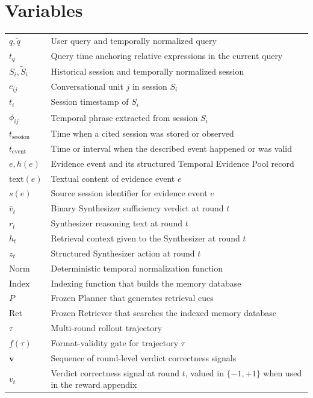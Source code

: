 \section*{Variables}
\renewcommand*{\arraystretch}{1.35}
\begin{longtable}{p{}p{}}
$q,\widetilde{q}$ & User query and temporally normalized query\\
$t_q$ & Query time anchoring relative expressions in the current query\\
$S_i,\widetilde{S}_i$ & Historical session and temporally normalized session\\
$c_{ij}$ & Conversational unit $j$ in session $S_i$\\
$t_i$ & Session timestamp of $S_i$\\
$\phi_{ij}$ & Temporal phrase extracted from session $S_i$\\
$t_{\mathrm{session}}$ & Time when a cited session was stored or observed\\
$t_{\mathrm{event}}$ & Time or interval when the described event happened or was valid\\
$e,h(e)$ & Evidence event and its structured Temporal Evidence Pool record\\
$\mathrm{text}(e)$ & Textual content of evidence event $e$\\
$s(e)$ & Source session identifier for evidence event $e$\\
$\hat{v}_t$ & Binary Synthesizer sufficiency verdict at round $t$\\
$r_t$ & Synthesizer reasoning text at round $t$\\
$h_t$ & Retrieval context given to the Synthesizer at round $t$\\
$z_t$ & Structured Synthesizer action at round $t$\\
$\mathrm{Norm}$ & Deterministic temporal normalization function\\
$\mathrm{Index}$ & Indexing function that builds the memory database\\
$P$ & Frozen Planner that generates retrieval cues\\
$\mathrm{Ret}$ & Frozen Retriever that searches the indexed memory database\\
$\tau$ & Multi-round rollout trajectory\\
$f(\tau)$ & Format-validity gate for trajectory $\tau$\\
$\mathbf{v}$ & Sequence of round-level verdict correctness signals\\
$v_t$ & Verdict correctness signal at round $t$, valued in $\{-1,+1\}$ when used in the reward appendix\\

\end{longtable}

